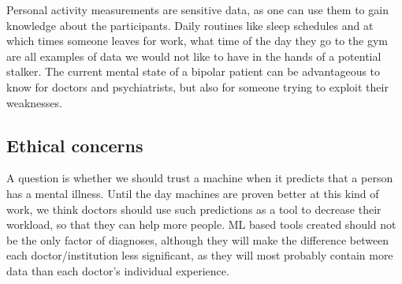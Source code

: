 Personal activity measurements are sensitive data, as one can use them to gain knowledge about the participants. Daily routines like sleep schedules and at which times someone leaves for work, what time of the day they go to the gym are all examples of data we would not like to have in the hands of a potential stalker. The current mental state of a bipolar patient can be advantageous to know for doctors and psychiatrists, but also for someone trying to exploit their weaknesses. 

\subsection{Ethical concerns}
A question is whether we should trust a machine when it predicts that a person has a mental illness. Until the day machines are proven better at this kind of work, we think doctors should use such predictions as a tool to decrease their workload, so that they can help more people. ML based tools created should not be the only factor of diagnoses, although they will make the difference between each doctor/institution less significant, as they will most probably contain more data than each doctor's individual experience. 




 






 

